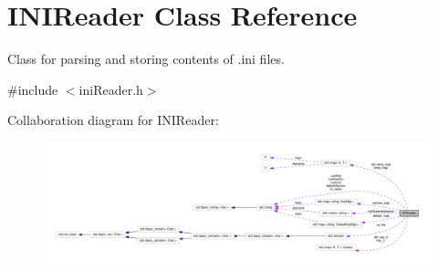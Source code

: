 \hypertarget{classINIReader}{\section{\-I\-N\-I\-Reader \-Class \-Reference}
\label{d5/de4/classINIReader}
}


\-Class for parsing and storing contents of .ini files.  




{\ttfamily \#include $<$ini\-Reader.\-h$>$}



\-Collaboration diagram for \-I\-N\-I\-Reader\-:\nopagebreak
\begin{figure}[H]
\begin{center}
\leavevmode
\includegraphics[width=350pt]{dc/d56/classINIReader__coll__graph}
\end{center}
\end{figure}
